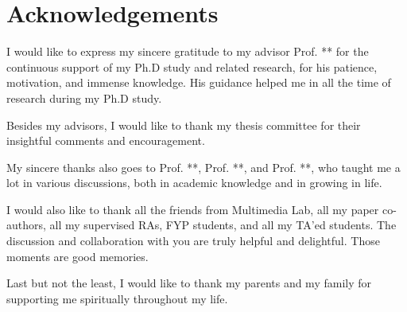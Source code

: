 
\chapter*{Acknowledgements}

I would like to express my sincere gratitude to my advisor Prof. ** for the continuous support of my Ph.D study and related research, for his patience, motivation, and immense knowledge.
His guidance helped me in all the time of research during my Ph.D study.

Besides my advisors, I would like to thank my thesis committee for their insightful comments and encouragement.

My sincere thanks also goes to Prof. **, Prof. **, and Prof. **, who taught me a lot in various discussions, both in academic knowledge and in growing in life.

I would also like to thank all the friends from Multimedia Lab,
all my paper co-authors,
all my supervised RAs, FYP students,
and all my TA'ed students.
The discussion and collaboration with you are truly helpful and delightful.
Those moments are good memories.

Last but not the least, I would like to thank my parents and my family for supporting me spiritually throughout my life.
